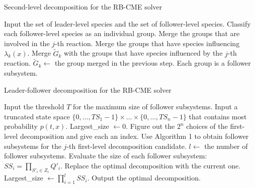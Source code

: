 \documentclass[11pt]{isr} %
\begin{document}
\newpage

\begin{algorithm}
\caption{Second-level decomposition for the RB-CME solver}
\begin{algorithmic}[1]
    \State Input the set of leader-level species and the set of follower-level species.
    \State Classify each follower-level species as an individual group. 
     
        \State Merge the groups that are involved in the $j$-th reaction. 
    \EndFor
     
        \State Merge the groups that have species influencing $\lambda_k(x)$. 
         
                \State Merge $\tilde{G}_k$ with the groups that have species influenced by the $j$-th reaction.
                \State $\tilde{G}_k \gets$ the group merged in the previous step.
            \EndIf
        \EndFor
    \EndFor
    \State Each group is a follower subsystem. 
\end{algorithmic}
\end{algorithm}


\begin{algorithm}
\caption{Leader-follower decomposition for the RB-CME solver}
\begin{algorithmic}[1]
    \State Input the threshold $T$ for the maximum size of follower subsystems.
    \State Input a truncated state space $\{0,\ldots,TS_1 - 1\} \times \ldots \times \{0,\ldots,TS_n - 1\}$ that contains most probability $p(t,x)$. 
    \State Largest\_size $\gets 0$. 
    \State Figure out the $2^n$ choices of the first-level decomposition and give each an index.
     
        \State Use Algorithm 1 to obtain follower subsystems for the $j$-th first-level decomposition candidate.
        \State $l \gets$ the number of follower subsystems.
        \State Evaluate the size of each follower subsystem: $SS_i = \prod_{S'_i \in Z_i} Q'_{i}$.
            \State Replace the optimal decomposition with the current one.
            \State Largest\_size $\gets \prod_{i=1}^{l} SS_i$.
        \EndIf
    \EndFor
    \State Output the optimal decomposition.
\end{algorithmic}
\end{algorithm}
\end{document}
